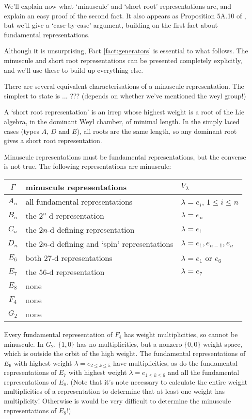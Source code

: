 We'll explain now what `minuscule' and `short root' representations are,
and explain an easy proof of the second fact. It also appears as Proposition 5A.10 of \cite{jantzen}, but we'll give
a `case-by-case' argument, building on the first fact about fundamental representations.

Although it is unsurprising, Fact \ref{fact:generators} is essential to what follows. The minuscule and short root representations can be
presented completely explicitly, and we'll use these to build up
everything else.

There are several equivalent characterisations of a minuscule
representation. The simplest to state is ... ??? (depends on whether
we've mentioned the weyl group!) \cite[\S 5A.1]{jantzen} \cite[ch. VI, \S 1, exercise 24]{bourbaki}

A `short root representation' is an irrep whose highest weight is a root of the Lie algebra, in the dominant Weyl chamber, of minimal length. In the
simply laced cases (types $A$, $D$ and $E$), all roots are the same length, so any dominant root gives a short root representation. \cite[\S 5A.2]{jantzen}

Minuscule representations must be fundamental representations, but the converse is not true. The
following representations are minuscule:
\begin{center}
\begin{tabular}{c|l|l}
 $\Gamma$ & minuscule representations & $V_\lambda$ \\
 \hline%
 $A_n$ & all fundamental representations & $\lambda = e_i$, $1 \leq i \leq n$ \\
 $B_n$ & the $2^n$-d representation      & $\lambda = e_n$ \\
 $C_n$ & the $2n$-d defining representation             & $\lambda = e_1$ \\
 $D_n$ & the $2n$-d defining and `spin' representations & $\lambda = e_1, e_{n-1}, e_{n}$ \\
 $E_6$ & both $27$-d representations                    & $\lambda = e_1$ or $e_6$ \\
 $E_7$ & the $56$-d representation                      & $\lambda = e_7$ \\
 $E_8$ & none                             & \\
 $F_4$ & none & \\
 $G_2$ & none &
\end{tabular}
\end{center}

Every fundamental representation of $F_4$ has weight multiplicities, so cannot be minuscule.
In $G_2$, $\{1,0\}$ has no multiplicities, but a nonzero $\{0,0\}$ weight space, which is outside the orbit of the high weight.
The fundamental representations of $E_6$ with highest weight $\lambda = e_{2 \leq k \leq 5}$ have multiplicities, as do the
fundamental representations of $E_7$ with highest weight $\lambda = e_{1 \leq k \leq 6}$ and all the fundamental representations of $E_8$.
(Note that it's note necessary to calculate the entire weight multiplicities of a representation to determine that at least one weight has multiplicity!
Otherwise is would be very difficult to determine the minuscule representations of $E_8$!)

